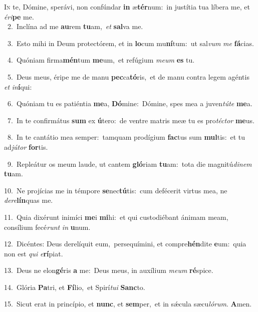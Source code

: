 \lettrine{\initial\textcolor{\initialcolor}{I}}{n} te, Dómine, sperávi, non confúndar \textbf{in} æ\-\textbf{tér}\-num:~\star in justítia tua líbera me, et \textit{é}\-\textit{ri}\textbf{pe} me.\\
{\numbfont\textcolor{\numbcolor}{~2.}}~Inclína ad me \textbf{au}\-rem \textbf{tu}\-am,~\star \textit{et} \textbf{sal}\-va me.\par
{\numbfont\textcolor{\numbcolor}{~3.}}~Esto mihi in Deum protectórem, et in \textbf{lo}\-cum mu\-\textbf{ní}\-tum:~\star ut sal\textit{vum} \textit{me} \textbf{fá}\-cias.\par
{\numbfont\textcolor{\numbcolor}{~4.}}~Quóniam firma\-\textbf{mén}\-tum \textbf{me}\-um,~\star et refúgium \textit{me}\-\textit{um} \textbf{es} tu.\par
{\numbfont\textcolor{\numbcolor}{~5.}}~Deus meus, éripe me de manu \textbf{pec}\-ca\-\textbf{tó}\-ris,~\star et de manu contra legem agéntis \textit{et} \textit{in}\-\textbf{í}qui:\par
{\numbfont\textcolor{\numbcolor}{~6.}}~Quóniam tu es patiéntia \textbf{me}\-a, \textbf{Dó}\-mine:~\star Dómine, spes mea a juven\-\textit{tú}\-\textit{te} \textbf{me}\-a.\par
{\numbfont\textcolor{\numbcolor}{~7.}}~In te confirmátus \textbf{sum} ex \textbf{ú}\-tero:~\star de ventre matris meæ tu es pro\-\textit{téc}\-\textit{tor} \textbf{me}\-us.\par
{\numbfont\textcolor{\numbcolor}{~8.}}~In te cantátio mea semper:~\dagger tamquam prodígium \textbf{fac}\-tus sum \textbf{mul}\-tis:~\star et tu ad\-\textit{jú}\-\textit{tor} \textbf{for}\-tis.\par
{\numbfont\textcolor{\numbcolor}{~9.}}~Repleátur os meum laude, ut cantem \textbf{gló}\-riam \textbf{tu}\-am:~\star tota die magnitú\-\textit{di}\-\textit{nem} \textbf{tu}\-am.\par
{\numbfont\textcolor{\numbcolor}{10.}}~Ne projícias me in témpore \textbf{se}\-nec\-\textbf{tú}\-tis:~\star cum defécerit virtus mea, ne \textit{de}\-\textit{re}\textbf{lín}quas me.\par
{\numbfont\textcolor{\numbcolor}{11.}}~Quia dixérunt inimíci \textbf{me}\-i \textbf{mi}\-hi:~\star et qui custodiébant ánimam meam, consílium fecé\textit{runt} \textit{in} \textbf{u}\-num.\par
{\numbfont\textcolor{\numbcolor}{12.}}~Dicéntes: Deus derelíquit eum,~\dagger persequímini, et compre\-\textbf{hén}\-dite \textbf{e}\-um:~\star quia non est \textit{qui} \textit{e}\-\textbf{rí}piat.\par
{\numbfont\textcolor{\numbcolor}{13.}}~Deus ne elon\-\textbf{gé}\-ris \textbf{a} me:~\star Deus meus, in auxílium \textit{me}\-\textit{um} \textbf{ré}\-spice.\par
{\numbfont\textcolor{\numbcolor}{14.}}~Glória \textbf{Pa}\-tri, et \textbf{Fí}\-lio,~\star et Spirí\-\textit{tu}\-\textit{i} \textbf{Sanc}\-to.\par
{\numbfont\textcolor{\numbcolor}{15.}}~Sicut erat in princípio, et \textbf{nunc}\-, et \textbf{sem}\-per,~\star et in sǽcula sæcu\-\textit{ló}\-\textit{rum}. \textbf{A}\-men.\par
